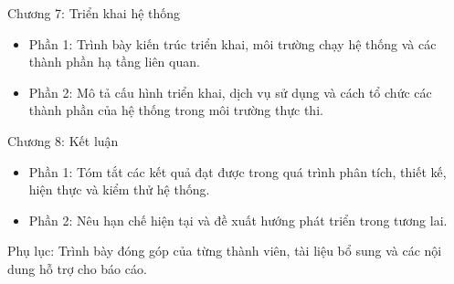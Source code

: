 Chương 7: Triển khai hệ thống
\begin{itemize}
\item Phần 1: Trình bày kiến trúc triển khai, môi trường chạy hệ thống và các thành phần hạ tầng liên quan.
\item Phần 2: Mô tả cấu hình triển khai, dịch vụ sử dụng và cách tổ chức các thành phần của hệ thống trong môi trường thực thi.
\end{itemize}

Chương 8: Kết luận
\begin{itemize}
\item Phần 1: Tóm tắt các kết quả đạt được trong quá trình phân tích, thiết kế, hiện thực và kiểm thử hệ thống.
\item Phần 2: Nêu hạn chế hiện tại và đề xuất hướng phát triển trong tương lai.
\end{itemize}

Phụ lục: Trình bày đóng góp của từng thành viên, tài liệu bổ sung và các nội dung hỗ trợ cho báo cáo.
